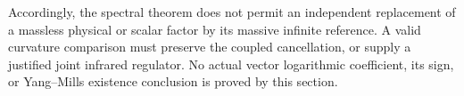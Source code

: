 Accordingly, the spectral theorem does not permit an independent
replacement of a massless physical or scalar factor by its
massive infinite reference.
A valid curvature comparison must preserve the coupled
cancellation, or supply a justified joint infrared regulator.
No actual vector logarithmic coefficient, its sign, or
Yang--Mills existence conclusion is proved by this section.

